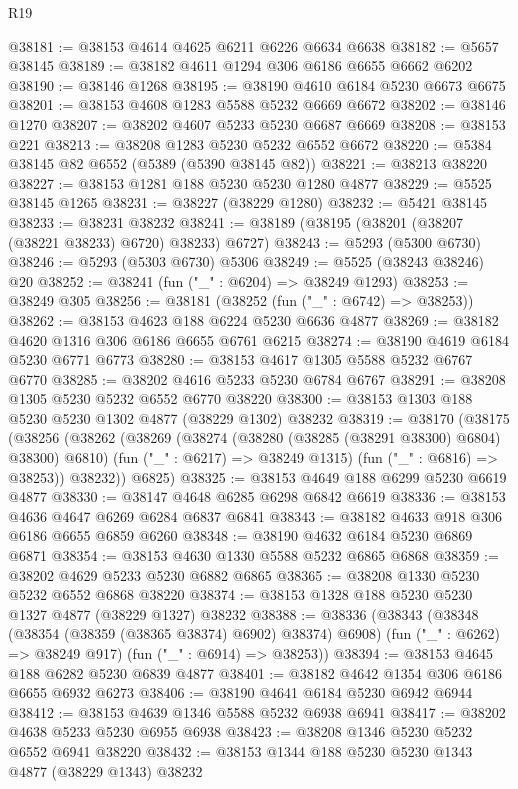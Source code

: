 \begin{lexlean}{R19}
\begin{coremodule}
@38181 := @38153 @4614 @4625 @6211 @6226 @6634 @6638
@38182 := @5657 @38145
@38189 := @38182 @4611 @1294 @306 @6186 @6655 @6662 @6202
@38190 := @38146 @1268
@38195 := @38190 @4610 @6184 @5230 @6673 @6675
@38201 := @38153 @4608 @1283 @5588 @5232 @6669 @6672
@38202 := @38146 @1270
@38207 := @38202 @4607 @5233 @5230 @6687 @6669
@38208 := @38153 @221
@38213 := @38208 @1283 @5230 @5232 @6552 @6672
@38220 := @5384 @38145 @82 @6552 (@5389 (@5390 @38145 @82))
@38221 := @38213 @38220
@38227 := @38153 @1281 @188 @5230 @5230 @1280 @4877
@38229 := @5525 @38145 @1265
@38231 := @38227 (@38229 @1280)
@38232 := @5421 @38145
@38233 := @38231 @38232
@38241 := @38189 (@38195 (@38201 (@38207 (@38221 @38233) @6720) @38233) @6727)
@38243 := @5293 (@5300 @6730)
@38246 := @5293 (@5303 @6730) @5306
@38249 := @5525 (@38243 @38246) @20
@38252 := @38241 (fun ("_" : @6204) => @38249 @1293)
@38253 := @38249 @305
@38256 := @38181 (@38252 (fun ("_" : @6742) => @38253))
@38262 := @38153 @4623 @188 @6224 @5230 @6636 @4877
@38269 := @38182 @4620 @1316 @306 @6186 @6655 @6761 @6215
@38274 := @38190 @4619 @6184 @5230 @6771 @6773
@38280 := @38153 @4617 @1305 @5588 @5232 @6767 @6770
@38285 := @38202 @4616 @5233 @5230 @6784 @6767
@38291 := @38208 @1305 @5230 @5232 @6552 @6770 @38220
@38300 := @38153 @1303 @188 @5230 @5230 @1302 @4877 (@38229 @1302) @38232
@38319 := @38170
    (@38175
      (@38256
        (@38262
          (@38269
            (@38274 (@38280 (@38285 (@38291 @38300) @6804) @38300) @6810)
            (fun ("_" : @6217) => @38249 @1315)
            (fun ("_" : @6816) => @38253))
          @38232))
      @6825)
@38325 := @38153 @4649 @188 @6299 @5230 @6619 @4877
@38330 := @38147 @4648 @6285 @6298 @6842 @6619
@38336 := @38153 @4636 @4647 @6269 @6284 @6837 @6841
@38343 := @38182 @4633 @918 @306 @6186 @6655 @6859 @6260
@38348 := @38190 @4632 @6184 @5230 @6869 @6871
@38354 := @38153 @4630 @1330 @5588 @5232 @6865 @6868
@38359 := @38202 @4629 @5233 @5230 @6882 @6865
@38365 := @38208 @1330 @5230 @5232 @6552 @6868 @38220
@38374 := @38153 @1328 @188 @5230 @5230 @1327 @4877 (@38229 @1327) @38232
@38388 := @38336
    (@38343
      (@38348 (@38354 (@38359 (@38365 @38374) @6902) @38374) @6908)
      (fun ("_" : @6262) => @38249 @917)
      (fun ("_" : @6914) => @38253))
@38394 := @38153 @4645 @188 @6282 @5230 @6839 @4877
@38401 := @38182 @4642 @1354 @306 @6186 @6655 @6932 @6273
@38406 := @38190 @4641 @6184 @5230 @6942 @6944
@38412 := @38153 @4639 @1346 @5588 @5232 @6938 @6941
@38417 := @38202 @4638 @5233 @5230 @6955 @6938
@38423 := @38208 @1346 @5230 @5232 @6552 @6941 @38220
@38432 := @38153 @1344 @188 @5230 @5230 @1343 @4877 (@38229 @1343) @38232

\end{coremodule}
\end{lexlean}
